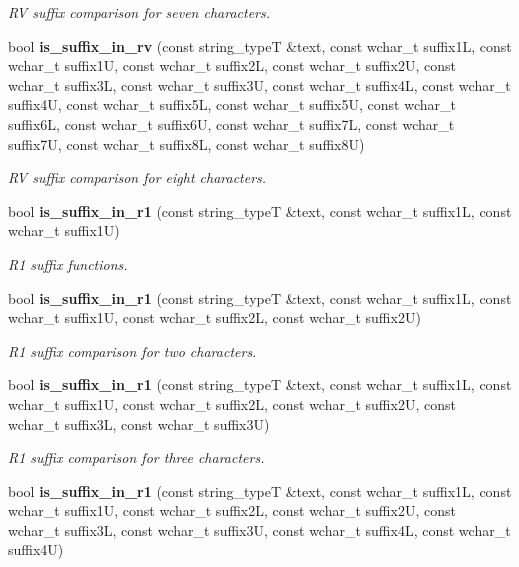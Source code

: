 \begin{DoxyCompactItemize}
\begin{DoxyCompactList}\small\item\em RV suffix comparison for seven characters. \end{DoxyCompactList}\item 
bool {\bf is\+\_\+suffix\+\_\+in\+\_\+rv} (const string\+\_\+typeT \&text, const wchar\+\_\+t suffix1L, const wchar\+\_\+t suffix1U, const wchar\+\_\+t suffix2L, const wchar\+\_\+t suffix2U, const wchar\+\_\+t suffix3L, const wchar\+\_\+t suffix3U, const wchar\+\_\+t suffix4L, const wchar\+\_\+t suffix4U, const wchar\+\_\+t suffix5L, const wchar\+\_\+t suffix5U, const wchar\+\_\+t suffix6L, const wchar\+\_\+t suffix6U, const wchar\+\_\+t suffix7L, const wchar\+\_\+t suffix7U, const wchar\+\_\+t suffix8L, const wchar\+\_\+t suffix8U)\label{classstemming_1_1stem_a553b6ed34e6b03e2c1ca42ea2db08ba6}

\begin{DoxyCompactList}\small\item\em RV suffix comparison for eight characters. \end{DoxyCompactList}\item 
bool {\bf is\+\_\+suffix\+\_\+in\+\_\+r1} (const string\+\_\+typeT \&text, const wchar\+\_\+t suffix1L, const wchar\+\_\+t suffix1U)
\begin{DoxyCompactList}\small\item\em R1 suffix functions. \end{DoxyCompactList}\item 
bool {\bf is\+\_\+suffix\+\_\+in\+\_\+r1} (const string\+\_\+typeT \&text, const wchar\+\_\+t suffix1L, const wchar\+\_\+t suffix1U, const wchar\+\_\+t suffix2L, const wchar\+\_\+t suffix2U)\label{classstemming_1_1stem_ab8cb2e00b39091f74b1064e1f0314c6f}

\begin{DoxyCompactList}\small\item\em R1 suffix comparison for two characters. \end{DoxyCompactList}\item 
bool {\bf is\+\_\+suffix\+\_\+in\+\_\+r1} (const string\+\_\+typeT \&text, const wchar\+\_\+t suffix1L, const wchar\+\_\+t suffix1U, const wchar\+\_\+t suffix2L, const wchar\+\_\+t suffix2U, const wchar\+\_\+t suffix3L, const wchar\+\_\+t suffix3U)\label{classstemming_1_1stem_a1fe4a63adfa5d4f378a060352d52edc1}

\begin{DoxyCompactList}\small\item\em R1 suffix comparison for three characters. \end{DoxyCompactList}\item 
bool {\bf is\+\_\+suffix\+\_\+in\+\_\+r1} (const string\+\_\+typeT \&text, const wchar\+\_\+t suffix1L, const wchar\+\_\+t suffix1U, const wchar\+\_\+t suffix2L, const wchar\+\_\+t suffix2U, const wchar\+\_\+t suffix3L, const wchar\+\_\+t suffix3U, const wchar\+\_\+t suffix4L, const wchar\+\_\+t suffix4U)\label{classstemming_1_1stem_a3fef2f8916933fa1965928f8e43a1b58}


\end{DoxyCompactItemize}
